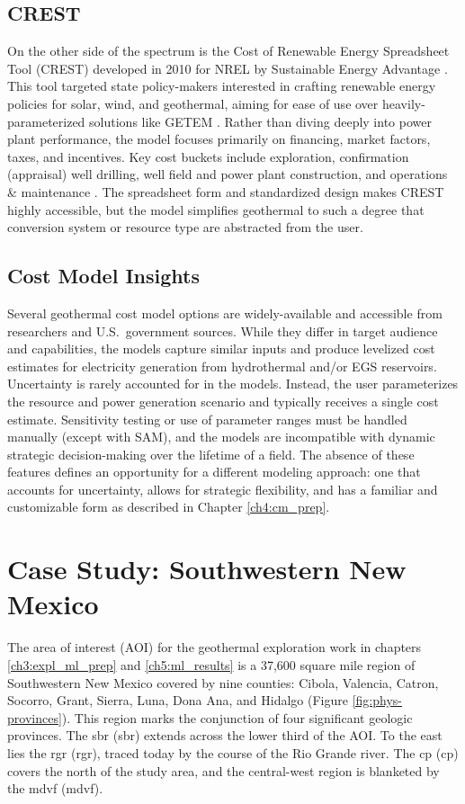 \subsection{CREST}\label{ch2:crest}
On the other side of the spectrum is the Cost of Renewable Energy Spreadsheet Tool (CREST) developed in 2010 for NREL by Sustainable Energy Advantage \citep{gifford_crest_2013}. This tool targeted state policy-makers interested in crafting renewable energy policies for solar, wind, and geothermal, aiming for ease of use over heavily-parameterized solutions like GETEM \citep{gifford_renewable_2011}. Rather than diving deeply into power plant performance, the model focuses primarily on financing, market factors, taxes, and incentives. Key cost buckets include exploration, confirmation (appraisal) well drilling, well field and power plant construction, and operations \& maintenance \citep{gifford_crest_2013}. The spreadsheet form and standardized design makes CREST highly accessible, but the model simplifies geothermal to such a degree that conversion system or resource type are abstracted from the user. 

\subsection{Cost Model Insights}\label{ch2:cost_model_insights}
Several geothermal cost model options are widely-available and accessible from researchers and U.S.\ government sources. While they differ in target audience and capabilities, the models capture similar inputs and produce levelized cost estimates for electricity generation from hydrothermal and/or EGS reservoirs. Uncertainty is rarely accounted for in the models. Instead, the user parameterizes the resource and power generation scenario and typically receives a single cost estimate. Sensitivity testing or use of parameter ranges must be handled manually (except with SAM), and the models are incompatible with dynamic strategic decision-making over the lifetime of a field. The absence of these features defines an opportunity for a different modeling approach: one that accounts for uncertainty, allows for strategic flexibility, and has a familiar and customizable form as described in Chapter \ref{ch4:cm_prep}. 

\section{Case Study: Southwestern New Mexico}\label{ch2:case_outline}
The area of interest (AOI) for the geothermal exploration work in chapters \ref{ch3:expl_ml_prep} and \ref{ch5:ml_results} is a 37,600 square mile region of Southwestern New Mexico covered by nine counties: Cibola, Valencia, Catron, Socorro, Grant, Sierra, Luna, Dona Ana, and Hidalgo (Figure \ref{fig:phys-provinces}). This region marks the conjunction of four significant geologic provinces. The \acrlong{sbr} (\acrshort{sbr}) extends across the lower third of the AOI. To the east lies the \acrlong{rgr} (\acrshort{rgr}), traced today by the course of the Rio Grande river. The \acrlong{cp} (\acrshort{cp}) covers the north of the study area, and the central-west region is blanketed by the \acrlong{mdvf} (\acrshort{mdvf}).

